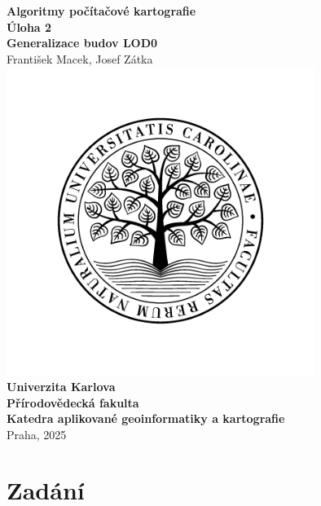 \documentclass[a4paper,12pt]{article}
\begin{document}
\begin{titlepage}
    \begin{center}
        {\huge \bfseries Algoritmy počítačové kartografie}\\
        \vspace{3.5em}
        {\Large \bfseries Úloha 2} \\
        \vspace{0.5em}
        {\Large \bfseries Generalizace budov LOD0} \\
        \vspace{3.5em}
        {\large František Macek, Josef Zátka} \\
        \vspace{2.5em}
        \includegraphics[width=10cm]{logo.png}\\
        \vspace{-2em}
        { \bfseries Univerzita Karlova}\\
        \vspace{0.33em}
        { \bfseries Přírodovědecká fakulta}\\
        \vspace{0.33em}
        { \bfseries Katedra aplikované geoinformatiky a kartografie}\\
        \vspace{10em}
        {\large Praha, 2025}
    \end{center}
\end{titlepage}

\section{Zadání}
\end{document}
